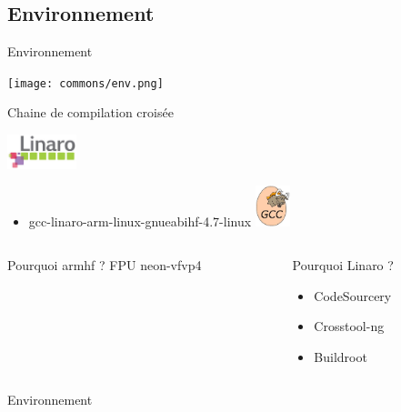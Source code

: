 \documentclass[11pt]{beamer}
\begin{document}
	\subsection{Environnement}
	\begin{frame}{Environnement}
	\begin{center}
	\texttt{[image: commons/env.png]}	
	\end{center}
	\end{frame}
	
	
	\begin{frame}{Chaine de compilation croisée}
	\begin{center}
	  \includegraphics[width=2cm]{commons/linaro.jpeg}
	\end{center}
	\begin{itemize}
			\item gcc-linaro-arm-linux-gnueabihf-4.7-linux
			\includegraphics[width=1cm]{commons/gnu.jpeg}
	\end{itemize}
	\begin{columns}[t]
	\begin{column}{5cm}
	\begin{block}{Pourquoi armhf ?}
		FPU neon-vfvp4
	\end{block}
	\end{column}
	\begin{column}{5cm}
	\begin{block}{Pourquoi Linaro ?}
	\begin{itemize}
	      \item CodeSourcery
	      \item Crosstool-ng
	      \item Buildroot
	\end{itemize}
	\end{block}
	\end{column}
	\end{columns}
	\end{frame}
	
	\begin{frame}{Environnement}
	\begin{center}
	
	\end{center}
	\end{frame}
	
\end{document}
